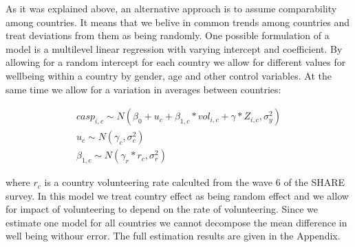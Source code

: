 \documentclass[10pt, letterpaper]{article}
\begin{document}
\begin{spacing}{1.4}
As it was explained above, an alternative approach is to assume comparability among countries. It means that we belive in common trends among countries and treat deviations from them as being randomly. One possible formulation of a model is a multilevel linear regression with varying intercept and coefficient. By allowing for a random intercept for each country we allow for different values for wellbeing within a country by gender, age and other control variables. At the same time we allow for a variation in averages between countries:


 \begin{eqnarray}
	casp_{i,c}\sim N(\beta_{0}+ u_{c} +  \beta_{1,c} * vol_{i,c}+\gamma*Z_{i,c},\sigma^{2}_{y}) \\	
	u_{c} \sim N(\gamma_{c},\sigma^{2}_{c}) \\
	\beta_{1,c} \sim N(\gamma_{r}*r_{c},\sigma^{2}_{r})
 \end{eqnarray}
 
where $r_{c}$ is a country volunteering rate calculted from the wave 6 of the SHARE survey. In this model we treat country effect as being random effect and we allow for impact of volunteering to depend on the rate of volunteering. Since we estimate one model for all countries we cannot decompose the mean difference in well being withour error. The full estimation results are given in the Appendix. 



\end{spacing}
\end{document}

